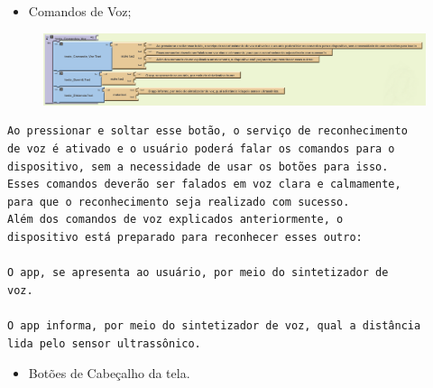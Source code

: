 \documentclass[portugues, brazil, a4paper,12pt]{article}
\begin{document}
\begin{itemize}
\item Comandos de Voz;
\end{itemize}
\begin{figure}[H]
	\centering
	\includegraphics[scale=.7]{img/ajuda/voz.png}
	
\end{figure}
\begin{verbatim}
Ao pressionar e soltar esse botão, o serviço de reconhecimento 
de voz é ativado e o usuário poderá falar os comandos para o 
dispositivo, sem a necessidade de usar os botões para isso.
Esses comandos deverão ser falados em voz clara e calmamente, 
para que o reconhecimento seja realizado com sucesso.
Além dos comandos de voz explicados anteriormente, o 
dispositivo está preparado para reconhecer esses outro:

O app, se apresenta ao usuário, por meio do sintetizador de 
voz.

O app informa, por meio do sintetizador de voz, qual a distância 
lida pelo sensor ultrassônico.

\end{verbatim}
\begin{itemize}
\item Botões de Cabeçalho da tela.
\end{itemize}
\end{document}
